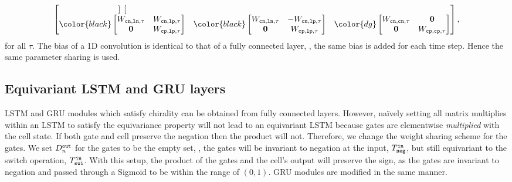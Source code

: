 \documentclass{article}
\begin{document}
$$\begin{bmatrix}
{\begin{bmatrix}
\end{bmatrix}
}\\
{\color{black}
\begin{bmatrix}
W_{\tt cn, ln, \tau} & W_{\tt cn, lp, \tau} \\
\bf 0 & W_{\tt cp, lp, \tau}\\
\end{bmatrix}
} 
& 
{\color{black}
\begin{bmatrix}
W_{\tt cn, ln, \tau} & -W_{\tt cn, lp, \tau} \\
\bf 0 & W_{\tt cp, lp, \tau}\\
\end{bmatrix}
}
&
{\color{dg}
\begin{bmatrix}
W_{\tt cn, cn, \tau} & \bf 0\\
\bf 0 & W_{\tt cp, cp, \tau}\\
\end{bmatrix}
}\\
\end{bmatrix},
$$
for all $\tau$. 
The bias of a 1D convolution is identical to that of a fully connected layer, \ie, the  same bias is added for each time step. Hence the same parameter sharing is used. 



\subsection{Equivariant LSTM and GRU layers}
LSTM and GRU modules which satisfy chirality can be obtained from fully connected layers.  
However, na\"ively setting all matrix multiplies within an LSTM to satisfy the equivariance property will not lead to an equivariant LSTM because gates are elementwise \textit{multiplied} with the cell state. If both  gate and cell  preserve the negation then the product will not. Therefore, we  change the weight sharing scheme for the gates. We set $D_{n}^{\tt out}$ for the gates to be the empty set, \ie,  the gates will be invariant to negation at the input, $T^{\tt in}_{\tt neg}$, but still equivariant to the switch operation, $T^{\tt in}_{\tt swi}$. With this setup, the product of the gates and the cell's output will preserve the sign, as the gates are invariant to negation and passed through a Sigmoid to be within the range of $(0,1)$.  GRU modules are modified  in the same manner. 
\end{document}
